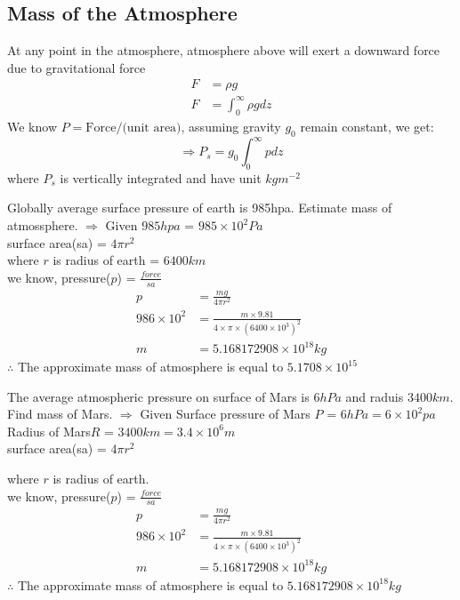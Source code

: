 \documentclass[fleqn,10pt]{SelfArx} %
\begin{document}
\subsection{Mass of the Atmosphere}

At any point in the atmosphere, atmosphere above will exert a downward force due to gravitational force
\begin{align}
    F &= \rho g \\
    F &= \int^\infty_0 \rho g dz   
\end{align}
 We know $P = \text{Force/(unit area)}$, assuming gravity $g_0$ remain constant, we get:
 \begin{equation}
    \Rightarrow P_s = g_0 \int^\infty_0 pdz
 \end{equation}
 where $P_s$ is vertically integrated and have unit $kgm^{-2}$
 
\begin{question}[label={q:4.4}]{Globally average surface pressure of earth is 985hpa. Estimate mass of atmossphere.}
    $\Rightarrow$ Given $985hpa$ = $985 \times 10^2Pa$ \\
    surface area(sa) = $4\pi r^2$ \\
    where $r$ is radius of earth = $6400km$ \\ 
    we know, pressure($p$) = $\frac{force}{sa}$
    \begin{align*}
        p &= \frac{mg}{4\pi r^2} \\
        986 \times 10^2 &= \frac{m \times 9.81}{4 \times \pi \times (6400 \times 10^3)^2} \\
        m &= 5.168172908\times 10^{18}kg 
    \end{align*}
    $\therefore$ The approximate mass of atmosphere is equal to $5.1708 \times 10^{15}$
\end{question}

\begin{question}[label={q:4.5}]{The average atmospheric pressure on surface of Mars is $6hPa$ and raduis $3400km$. Find mass of Mars.}
    $\Rightarrow$ Given Surface pressure of Mars $P$ = $6hPa = 6 \times 10^2pa$ \\
    Radius of Mars$R$ = $3400km = 3.4 \times 10^6m$\\
    surface area(sa) = $4\pi r^2$ 

    where $r$ is radius of earth. \\ 
    we know, pressure($p$) = $\frac{force}{sa}$
    \begin{align*}
        p &= \frac{mg}{4\pi r^2} \\
        986 \times 10^2 &= \frac{m \times 9.81}{4 \times \pi \times (6400 \times 10^3)^2} \\
        m &= 5.168172908\times 10^{18}kg 
    \end{align*}
    $\therefore$ The approximate mass of atmosphere is equal to $5.168172908\times 10^{18}kg$
\end{question}
\end{document}
